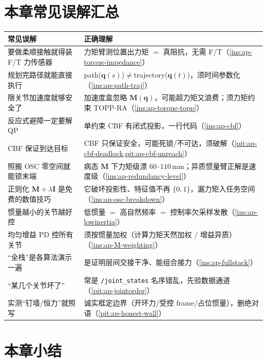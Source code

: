 \section*{本章常见误解汇总}

\begin{table}[H]\centering\small
\begin{tabular}{p{} p{}}
\toprule
\textbf{常见误解} & \textbf{正确理解} \\
\midrule
要做柔顺接触就得装 F/T 力传感器 & 力矩臂测位置出力矩 $=$ 真阻抗，无需 F/T（\cref{ins:ap-torque-impedance}）\\
规划完路径就能直接执行 & path($\mathbf{q}(s)$)$\ne$trajectory($\mathbf{q}(t)$)，须时间参数化（\cref{ins:ap-path-traj}）\\
限关节加速度就够安全了 & 加速度盒忽略 $\mathbf{M}(\mathbf{q})$，可能超力矩又浪费；须力矩约束 TOPP-RA（\cref{ins:ap-torque-topp}）\\
反应式避障一定要解 QP & 单约束 CBF 有闭式投影，一行代码（\cref{ins:ap-cbf}）\\
CBF 保证到达目标 & CBF 只保证安全，可能死锁/不可达，须破解（\cref{pit:ap-cbf-deadlock,pit:ap-cbf-unreach}）\\
照搬 OSC 零空间就能锁末端 & 病态 $\mathbf{M}$ 下力矩级漂 $60$--$110\,\mathrm{mm}$；异质惯量臂正解是速度级（\cref{ins:ap-redundancy-level}）\\
正则化 $\mathbf{M}+\lambda\mathbf{I}$ 是免费的数值技巧 & 它破坏投影性、特征值不再 $\{0,1\}$，漏力矩入任务空间（\cref{ins:ap-osc-breakdown}）\\
惯量越小的关节越好控 & 低惯量 $=$ 高自然频率 $=$ 控制率欠采样发散（\cref{ins:ap-lowinertia}）\\
均匀增益 PD 控所有关节 & 须按惯量加权（计算力矩天然加权 / 增益异质）（\cref{ins:ap-M-weighting}）\\
“全栈”是各算法演示一遍 & 是证明层间交接干净、能组合接力（\cref{ins:ap-fullstack}）\\
“某几个关节坏了” & 常是 \texttt{/joint\_states} 名序错乱，先验数据通道（\cref{pit:ap-jointorder}）\\
实测“钉墙/恒力”就照写 & 诚实框定边界（开环力/受控 frame/占位惯量），删绝对语（\cref{pit:ap-honest-wall}）\\
\bottomrule
\end{tabular}
\end{table}

\section*{本章小结}

